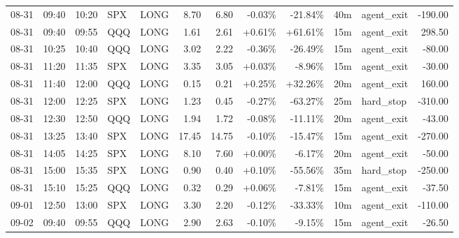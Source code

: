 \documentclass[11pt,a4paper]{article}
\begin{document}
\begin{center}
\begin{longtable}{>{\color{txtmain}}l l l l l r r r r r >{\color{txtmain}}l r}
08-31 & 09:40 & 10:20 & SPX & LONG & 8.70 & 6.80 & \textcolor{lossred}{-0.03\%} & \textcolor{lossred}{-21.84\%} & 40m & agent\_exit & \textcolor{lossred}{-190.00} \\
08-31 & 09:40 & 09:55 & QQQ & LONG & 1.61 & 2.61 & \textcolor{wingreen}{+0.61\%} & \textcolor{wingreen}{+61.61\%} & 15m & agent\_exit & \textcolor{wingreen}{298.50} \\
08-31 & 10:25 & 10:40 & QQQ & LONG & 3.02 & 2.22 & \textcolor{lossred}{-0.36\%} & \textcolor{lossred}{-26.49\%} & 15m & agent\_exit & \textcolor{lossred}{-80.00} \\
08-31 & 11:20 & 11:35 & SPX & LONG & 3.35 & 3.05 & \textcolor{wingreen}{+0.03\%} & \textcolor{lossred}{-8.96\%} & 15m & agent\_exit & \textcolor{lossred}{-30.00} \\
08-31 & 11:40 & 12:00 & QQQ & LONG & 0.15 & 0.21 & \textcolor{wingreen}{+0.25\%} & \textcolor{wingreen}{+32.26\%} & 20m & agent\_exit & \textcolor{wingreen}{160.00} \\
08-31 & 12:00 & 12:25 & SPX & LONG & 1.23 & 0.45 & \textcolor{lossred}{-0.27\%} & \textcolor{lossred}{-63.27\%} & 25m & hard\_stop & \textcolor{lossred}{-310.00} \\
08-31 & 12:30 & 12:50 & QQQ & LONG & 1.94 & 1.72 & \textcolor{lossred}{-0.08\%} & \textcolor{lossred}{-11.11\%} & 20m & agent\_exit & \textcolor{lossred}{-43.00} \\
08-31 & 13:25 & 13:40 & SPX & LONG & 17.45 & 14.75 & \textcolor{lossred}{-0.10\%} & \textcolor{lossred}{-15.47\%} & 15m & agent\_exit & \textcolor{lossred}{-270.00} \\
08-31 & 14:05 & 14:25 & SPX & LONG & 8.10 & 7.60 & \textcolor{wingreen}{+0.00\%} & \textcolor{lossred}{-6.17\%} & 20m & agent\_exit & \textcolor{lossred}{-50.00} \\
08-31 & 15:00 & 15:35 & SPX & LONG & 0.90 & 0.40 & \textcolor{wingreen}{+0.10\%} & \textcolor{lossred}{-55.56\%} & 35m & hard\_stop & \textcolor{lossred}{-250.00} \\
08-31 & 15:10 & 15:25 & QQQ & LONG & 0.32 & 0.29 & \textcolor{wingreen}{+0.06\%} & \textcolor{lossred}{-7.81\%} & 15m & agent\_exit & \textcolor{lossred}{-37.50} \\
09-01 & 12:50 & 13:00 & SPX & LONG & 3.30 & 2.20 & \textcolor{lossred}{-0.12\%} & \textcolor{lossred}{-33.33\%} & 10m & agent\_exit & \textcolor{lossred}{-110.00} \\
09-02 & 09:40 & 09:55 & QQQ & LONG & 2.90 & 2.63 & \textcolor{lossred}{-0.10\%} & \textcolor{lossred}{-9.15\%} & 15m & agent\_exit & \textcolor{lossred}{-26.50} \\

\end{longtable}
\end{center}
\end{document}
